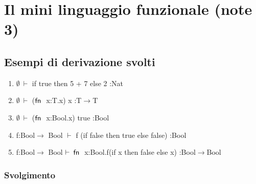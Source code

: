 \section{Il mini linguaggio funzionale (note 3)}
\subsection*{Esempi di derivazione svolti}
 
\begin{enumerate}[label=\alph*)]
	\item $\emptyset\:\vdash$  if true then 5 + 7 else 2 :Nat
	\item $\emptyset\:\vdash$  ($\fn$ x:T.x) x :T$\rightarrow$T
	\item $\emptyset\:\vdash$  ($\fn$ x:Bool.x) true :Bool
	\item f:Bool$\rightarrow$ Bool $\vdash$ f (if false then true else false) :Bool
	\item f:Bool$\rightarrow$ Bool $\vdash\:\fn$ x:Bool.f(if x then false else x) :Bool$\rightarrow$Bool
\end{enumerate}

\subsubsection*{Svolgimento}

